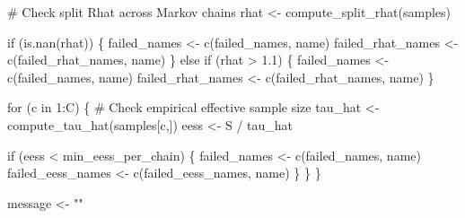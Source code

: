 \documentclass[
  letterpaper,
  DIV=11,
  numbers=noendperiod]{scrartcl}
\newenvironment{Shaded}{\begin{snugshade}}{\end{snugshade}}
\newcommand{\CommentTok}[1]{\textcolor[rgb]{0.37,0.37,0.37}{#1}}
\newcommand{\ControlFlowTok}[1]{\textcolor[rgb]{0.00,0.23,0.31}{#1}}
\newcommand{\DecValTok}[1]{\textcolor[rgb]{0.68,0.00,0.00}{#1}}
\newcommand{\FloatTok}[1]{\textcolor[rgb]{0.68,0.00,0.00}{#1}}
\newcommand{\KeywordTok}[1]{\textcolor[rgb]{0.00,0.23,0.31}{#1}}
\newcommand{\NormalTok}[1]{\textcolor[rgb]{0.00,0.23,0.31}{#1}}
\newcommand{\OperatorTok}[1]{\textcolor[rgb]{0.37,0.37,0.37}{#1}}
\newcommand{\StringTok}[1]{\textcolor[rgb]{0.13,0.47,0.30}{#1}}
\begin{document}
\begin{Shaded}
\begin{Highlighting}[]
    \CommentTok{\# Check split Rhat across Markov chains}
\NormalTok{    rhat }\OperatorTok{\textless{}{-}}\NormalTok{ compute\_split\_rhat(samples)}

    \ControlFlowTok{if}\NormalTok{ (}\KeywordTok{is}\NormalTok{.nan(rhat)) \{}
\NormalTok{      failed\_names }\OperatorTok{\textless{}{-}}\NormalTok{ c(failed\_names, name)}
\NormalTok{      failed\_rhat\_names }\OperatorTok{\textless{}{-}}\NormalTok{ c(failed\_rhat\_names, name)}
\NormalTok{    \} }\ControlFlowTok{else} \ControlFlowTok{if}\NormalTok{ (rhat }\OperatorTok{\textgreater{}} \FloatTok{1.1}\NormalTok{) \{}
\NormalTok{      failed\_names }\OperatorTok{\textless{}{-}}\NormalTok{ c(failed\_names, name)}
\NormalTok{      failed\_rhat\_names }\OperatorTok{\textless{}{-}}\NormalTok{ c(failed\_rhat\_names, name)}
\NormalTok{    \}}

    \ControlFlowTok{for}\NormalTok{ (c }\KeywordTok{in} \DecValTok{1}\NormalTok{:C) \{}
      \CommentTok{\# Check empirical effective sample size}
\NormalTok{      tau\_hat }\OperatorTok{\textless{}{-}}\NormalTok{ compute\_tau\_hat(samples[c,])}
\NormalTok{      eess }\OperatorTok{\textless{}{-}}\NormalTok{ S }\OperatorTok{/}\NormalTok{ tau\_hat}
      
      \ControlFlowTok{if}\NormalTok{ (eess }\OperatorTok{\textless{}}\NormalTok{ min\_eess\_per\_chain) \{}
\NormalTok{        failed\_names }\OperatorTok{\textless{}{-}}\NormalTok{ c(failed\_names, name)}
\NormalTok{        failed\_eess\_names }\OperatorTok{\textless{}{-}}\NormalTok{ c(failed\_eess\_names, name)}
\NormalTok{      \}}
\NormalTok{    \}}
\NormalTok{  \}}
  
\NormalTok{  message }\OperatorTok{\textless{}{-}} \StringTok{""}
  

\end{Highlighting}
\end{Shaded}
\end{document}
